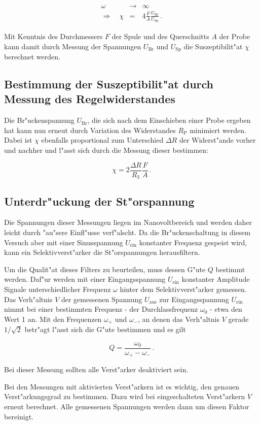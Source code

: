 		\begin{eqnarray}
			\omega & \rightarrow & \infty \nonumber \\
			\Rightarrow \quad \chi & = & 4 \frac{F}{A}\frac{U_\mathrm{Br}}{U_\mathrm{Sp}}\,. \label{chi_u}
		\end{eqnarray}

		Mit Kenntnis des Durchmessers $F$ der Spule und des Querschnitts $A$ der Probe kann damit durch Messung der Spannungen $U_\mathrm{Br}$ und $U_\mathrm{Sp}$ die Suszeptibilit"at $\chi$ berechnet werden.

	
	\subsection{Bestimmung der Suszeptibilit"at durch Messung des Regelwiderstandes}
		\label{subsec:messung_u}
		Die Br"uckenspannung $U_\mathrm{Br}$, die sich nach dem Einschieben einer Probe ergeben hat kann nun erneut durch Variation des Widerstandes $R_\mathrm{P}$ minimiert werden.
		Dabei ist $\chi$ ebenfalls proportional zum Unterschied $\Delta R$ der Widerst"ande vorher und nachher und l"asst sich durch die Messung dieser bestimmen:

		\begin{equation}
			\label{chi_r}
			\chi = 2 \frac{\Delta R}{R_3}\frac{F}{A}\,.
		\end{equation}

	\subsection{Unterdr"uckung der St"orspannung}
		Die Spannungen dieser Messungen liegen im Nanovoltbereich und werden daher leicht durch "au"sere Einfl"usse verf"alscht.
		Da die Br"uckenschaltung in diesem Versuch aber mit einer Sinusspannung $U_\mathrm{ein}$ konstanter Frequenz gespeist wird, kann ein Selektivverst"arker die St"orspannungen herausfiltern.

		Um die Qualit"at dieses Filters zu beurteilen, muss dessen G"ute $Q$ bestimmt werden.
		Daf"ur werden mit einer Eingangsspannung $U_\mathrm{ein}$ konstanter Amplitude Signale unterschiedlicher Frequenz $\omega$ hinter dem Selektivverst"arker gemessen.
		Das Verh"altnis $V$ der gemessenen Spannung $U_\mathrm{aus}$ zur Eingangsspannung $U_\mathrm{ein}$ nimmt bei einer bestimmten Frequenz - der Durchlassfrequenz $\omega_0$ - etwa den Wert 1 an.
		Mit den Frequenzen $\omega_+$ und $\omega_-$, an denen das Verh"altnis $V$ gerade $1/\sqrt{2}$ betr"agt l"asst sich die G"ute bestimmen und es gilt

		\begin{equation}
			Q = \frac{\omega_0}{\omega_+ - \omega_-}\,.
		\end{equation}

		Bei dieser Messung sollten alle Verst"arker deaktiviert sein.

		Bei den Messungen mit aktivierten Verst"arkern ist es wichtig, den genauen Verst"arkungsgrad zu bestimmen.
		Dazu wird bei eingeschalteten Verst"arkern $V$ erneut berechnet.
		Alle gemessenen Spannungen werden dann um diesen Faktor bereinigt.